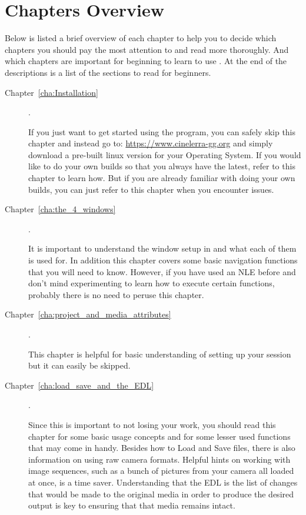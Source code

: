 \section*{Chapters Overview}%
\label{sec:chapters_overview}

Below is listed a brief overview of each chapter to help you to decide which chapters you should pay the most attention to and read more thoroughly.
And which chapters are important for beginning to learn to use \CGG{}. At the end of the descriptions is a list of the sections to read for beginners.

\begin{description}
    \item[Chapter~\ref{cha:Installation} ] .

        If you just want to get started using the program, you can safely skip this chapter and instead go to:
        {\small \url{https://www.cinelerra-gg.org}}
        and simply download a pre-built linux version for your Operating System. If you would like to do your own builds so that you always have the latest, refer to this chapter to learn how.
        But if you are already familiar with doing your own builds, you can just refer to this chapter when you encounter issues.
    \item[Chapter~\ref{cha:the_4_windows} ] .

        It is important to understand the window setup in \CGG{} and what each of them is used for.
        In addition this chapter covers some basic navigation functions that you will need to know.
        However, if you have used an NLE before and don’t mind experimenting to learn how to execute certain functions, probably there is no need to peruse this chapter.
    \item[Chapter~\ref{cha:project_and_media_attributes}] .

        This chapter is helpful for basic understanding of setting up your session but it can easily be skipped.

    \item[Chapter~\ref{cha:load_save_and_the_EDL}] .

        Since this is important to not losing your work, you should read this chapter for some basic usage concepts and for some lesser used functions that may come in handy.
        Besides how to Load and Save files, there is also information on using raw camera formats.
        Helpful hints on working with image sequences, such as a bunch of pictures from your camera all loaded at once, is a time saver. Understanding that the EDL is the list of changes that
would be made to the original media in order to produce the desired output is key to ensuring
that that media remains intact.


\end{description}

